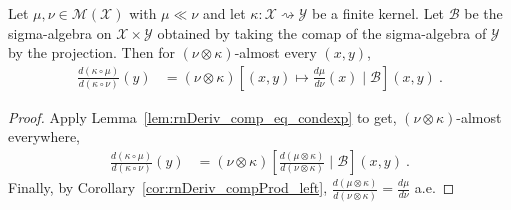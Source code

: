 \begin{lemma}
  \label{lem:rnDeriv_comp_eq_condexp_right}
  \leanok
  \uses{}
  Let $\mu, \nu \in \mathcal M(\mathcal X)$ with $\mu \ll \nu$ and let $\kappa : \mathcal X \rightsquigarrow \mathcal Y$ be a finite kernel.
  Let $\mathcal B$ be the sigma-algebra on $\mathcal X \times \mathcal Y$ obtained by taking the comap of the sigma-algebra of $\mathcal Y$ by the projection.
  Then for $(\nu \otimes \kappa)$-almost every $(x,y)$,
  \begin{align*}
  \frac{d(\kappa \circ \mu)}{d(\kappa \circ \nu)}(y)
  &= (\nu \otimes \kappa)\left[ (x, y) \mapsto \frac{d \mu}{d \nu}(x) \mid \mathcal B \right](x,y)
  \: .
  \end{align*}
  
\end{lemma}

\begin{proof}\leanok
{}
Apply Lemma~\ref{lem:rnDeriv_comp_eq_condexp} to get, $(\nu \otimes \kappa)$-almost everywhere,
\begin{align*}
\frac{d(\kappa \circ \mu)}{d(\kappa \circ \nu)}(y)
&= (\nu \otimes \kappa)\left[ \frac{d (\mu \otimes \kappa)}{d (\nu \otimes \kappa)} \mid \mathcal B\right](x,y)
\: .
\end{align*}
Finally, by Corollary~\ref{cor:rnDeriv_compProd_left}, $\frac{d (\mu \otimes \kappa)}{d (\nu \otimes \kappa)} = \frac{d \mu}{d \nu}$ a.e.
\end{proof}